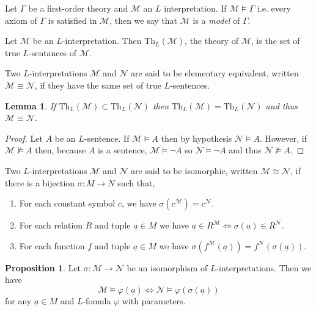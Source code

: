 \documentclass[12pt]{article}
\newcommand{\entails}{\models}
\newcommand{\Mmod}{\mathcal{M}}
\newcommand{\Nmod}{\mathcal{N}}
\newcommand{\ul}[1]{\underline{#1}}
\newcommand{\Th}[2]{\mathrm{Th}_{#1} \left( #2 \right)}
\newenvironment{definition}[1][Definition:]{\begin{trivlist}
\item[\hskip \labelsep {\bfseries #1}]}{\end{trivlist}}
\theoremstyle{theorem}
\newtheorem{lemma}[theorem]{Lemma}
\theoremstyle{definition}
\theoremstyle{definition}
\newtheorem*{proposition}{Proposition}
\theoremstyle{remark}
\theoremstyle{definition}
\theoremstyle{remark}
\begin{document}
\begin{definition}
Let $\Gamma$ be a first-order theory and $\Mmod$ an $L$ interpretation. If $\Mmod \entails \Gamma$ i.e. every axiom of $\Gamma$ is satisfied in $\Mmod$, then we say that $\Mmod$ is a \textit{model} of $\Gamma$.
\end{definition}

\begin{definition}
Let $\Mmod$ be an $L$-interpretation. Then $\Th{L}{\Mmod}$, the theory of $\Mmod$, is the set of true $L$-sentances of $\Mmod$.
\end{definition}

\begin{definition}
Two $L$-interpretations $\Mmod$ and $\Nmod$ are said to be elementary equivalent, written $\Mmod \equiv \Nmod$, if they have the same set of true $L$-sentences.  
\end{definition}

\begin{lemma}
If $\Th{L}{\Mmod} \subset \Th{L}{\Nmod}$ then $\Th{L}{\Mmod} = \Th{L}{\Nmod}$ and thus $\Mmod \equiv \Nmod$.
\end{lemma}

\begin{proof}
Let $A$ be an $L$-sentence. If $\Mmod \entails A$  then by hypothesis $\Nmod \entails A$. However, if $\Mmod \not\entails A$ then, because $A$ is a sentence, $\Mmod \entails \neg A$ so $\Nmod \entails \neg A$ and thus $\Nmod \not\entails A$.  
\end{proof}

\begin{definition}
Two $L$-interpretations $\Mmod$ and $\Nmod$ are said to be isomorphic, written $\Mmod \cong \Nmod$, if there is a bijection $\sigma : M \to N$ such that,
\begin{enumerate}
\item For each constant symbol $c$, we have $\sigma(c^{\Mmod}) = c^{\Nmod}$.
\item For each relation $R$ and tuple $\ul{a} \in M$ we have $\ul{a} \in R^{\Mmod} \iff \sigma(\ul{a}) \in R^{\Nmod}$.
\item For each function $f$ and tuple $\ul{a} \in M$ we have $\sigma(f^{\Mmod}(\ul{a})) = f^{\Nmod}(\sigma(\ul{a}))$. 
\end{enumerate} 
\end{definition}

\begin{proposition}
Let $\sigma : \Mmod \to \Nmod$ be an isomorphism of $L$-interpretations. Then we have
\[\Mmod \entails \varphi(\ul{a}) \iff \Nmod \entails \varphi(\sigma(\ul{a}))\]
for any $\ul{a} \in M$ and $L$-fomula $\varphi$ with parameters. 
\end{proposition}
\end{document}
